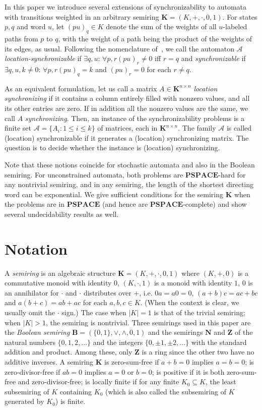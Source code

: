 \documentclass[submission,copyright,creativecommons]{eptcs}
\def\bK{{\mathbf{K}}}
\def\bN{{\mathbf{N}}}
\def\bZ{{\mathbf{Z}}}
\def\bB{{\mathbf{B}}}
\theoremstyle{plain}
\theoremstyle{definition}
\theoremstyle{remark}
\begin{document}
In this paper we introduce several extensions of synchronizability to automata with transitions weighted in an arbitrary semiring $\bK=(K,+,\cdot,0,1)$. For states $p,q$ and word $u$, let $(pu)_q\in K$ denote the sum of the weights of all $u$-labeled paths from $p$ to $q$, with the weight of a path being the product of the weights of its edges, as usual.
Following the nomenclature of~\cite{larsen},
we call the automaton $\mathcal{A}$ \emph{location-synchronizable} if $\exists q,u$: $\forall p,r$\quad$(pu)_r\neq 0$ iff $r=q$ and \emph{synchronizable} if $\exists q,u,k\neq 0$: $\forall p,r$\quad $(pu)_q=k$ and $(pu)_r=0$ for each $r\neq q$.

As an equivalent formulation, let us call a matrix $A\in\bK^{n\times n}$ \emph{location synchronizing} if it contains a column entirely filled with nonzero values, and all its other entries are zero.
If in addition all the nonzero values are the same, we call $A$ \emph{synchronizing}.
Then, an instance of the synchronizability problems is a finite set $\mathcal{A}=\{A_i:1\leq i\leq k\}$ of matrices, each in $\bK^{n\times n}$. 
The family $\mathcal{A}$ is called (location) synchronizable if it generates a (location) synchronizing matrix.
The question is to decide whether the instance is (location) synchronizing.

Note that these notions coincide for stochastic automata and also in the Boolean semiring.
For unconstrained automata, both problems are $\mathbf{PSPACE}$-hard for any nontrivial semiring, and in any semiring,
the length of the shortest directing word can be exponential.
We give sufficient conditions for the semiring $\bK$ when the problems are in $\mathbf{PSPACE}$ (and hence are $\mathbf{PSPACE}$-complete)
and show several undecidability results as well.

\section{Notation}

A \emph{semiring} is an algebraic structure $\bK=(K,+,\cdot,0,1)$ where $(K,+,0)$ is a commutative monoid with identity $0$,
$(K,\cdot,1)$ is a monoid with identity $1$, $0$ is an annihilator for $\cdot$ and $\cdot$ distributes over $+$, i.e.
$0a=a0=0$, $(a+b)c=ac+bc$ and $a(b+c)=ab+ac$ for each $a,b,c\in K$. (When the context is clear, we usually omit the $\cdot$ sign.)
The case when $|K|=1$ is that of the trivial semiring; when $|K|>1$, the semiring is nontrivial.
Three semirings used in this paper are
the \emph{Boolean semiring} $\bB=(\{0,1\},\vee,\wedge,0,1)$
and the semirings $\bN$ and $\bZ$ of the natural numbers $\{0,1,2,\ldots\}$ and the integers $\{0,\pm 1,\pm 2,\ldots\}$
with the standard addition and product. Among these, only $\bZ$ is a ring since the other two have no additive inverses.
A semiring $\bK$ is zero-sum-free if $a+b=0$ implies $a=b=0$; is zero-divisor-free if $ab=0$ implies $a=0$ or $b=0$;
is positive if it is both zero-sum-free and zero-divisor-free;
is locally finite if for any finite $K_0\subseteq K$, the least subsemiring of $K$ containing $K_0$ (which is also called
the subsemiring of $K$ generated by $K_0$) is finite.
\end{document}
